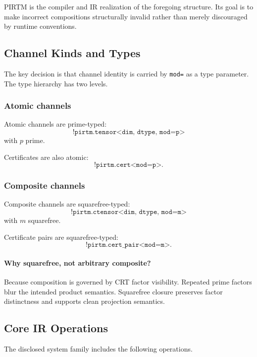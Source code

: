 \documentclass[11pt]{article}
\begin{document}
PIRTM is the compiler and IR realization of the foregoing structure. Its goal is to make incorrect compositions structurally invalid rather than merely discouraged by runtime conventions.

\subsection{Channel Kinds and Types}

The key decision is that channel identity is carried by \texttt{mod=} as a type parameter. The type hierarchy has two levels.

\subsubsection{Atomic channels}

Atomic channels are prime-typed:
\[
\texttt{!pirtm.tensor<dim, dtype, mod=p>}
\]
with \(p\) prime.

Certificates are also atomic:
\[
\texttt{!pirtm.cert<mod=p>}.
\]

\subsubsection{Composite channels}

Composite channels are squarefree-typed:
\[
\texttt{!pirtm.ctensor<dim, dtype, mod=m>}
\]
with \(m\) squarefree.

Certificate pairs are squarefree-typed:
\[
\texttt{!pirtm.cert\_pair<mod=m>}.
\]

\paragraph{Why squarefree, not arbitrary composite?}
Because composition is governed by CRT factor visibility. Repeated prime factors blur the intended product semantics. Squarefree closure preserves factor distinctness and supports clean projection semantics.

\subsection{Core IR Operations}

The disclosed system family includes the following operations.
\end{document}
